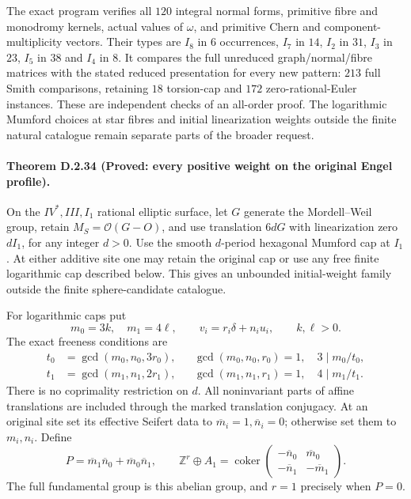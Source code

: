 The exact program 
verifies all $120$ integral normal forms, primitive fibre
and monodromy kernels, actual values of $\omega$, and
primitive Chern and component-multiplicity vectors.
Their types are $I_8$ in $6$ occurrences, $I_7$ in $14$,
$I_2$ in $31$, $I_3$ in $23$, $I_5$ in $38$ and $I_4$
in $8$. It compares the full unreduced graph/normal/fibre
matrices with the stated reduced presentation for every
new pattern: $213$ full Smith comparisons, retaining
$18$ torsion-cap and $172$ zero-rational-Euler instances.
These are independent checks of an all-order proof.
The logarithmic Mumford choices at star fibres and
initial linearization weights outside the finite natural
catalogue remain separate parts of the broader request.


\paragraph{Theorem D.2.34 (Proved: every positive weight on the original Engel profile).}
On the $IV^*,III,I_1$ rational elliptic surface, let $G$
generate the Mordell--Weil group, retain
$M_S=\mathcal O(G-O)$, and use translation $6dG$ with
linearization zero $dI_1$, for any integer $d>0$.
Use the smooth $d$-period hexagonal Mumford cap at $I_1$.
At either additive site one may retain the original cap
or use any free finite logarithmic cap described below.
This gives an unbounded initial-weight family outside
the finite sphere-candidate catalogue.

For logarithmic caps put
\[
 m_0=3k,\quad m_1=4\ell,\qquad
 v_i=r_i\delta+n_i u_i,\qquad k,\ell>0.
\]
The exact freeness conditions are
\[
\begin{aligned}
 t_0&=\gcd(m_0,n_0,3r_0),&
 &\gcd(m_0,n_0,r_0)=1,\quad 3\mid m_0/t_0,\\
 t_1&=\gcd(m_1,n_1,2r_1),&
 &\gcd(m_1,n_1,r_1)=1,\quad 4\mid m_1/t_1 .
\end{aligned}                                             \tag{D.WE1}
\]
There is no coprimality restriction on $d$.
All noninvariant parts of affine translations are
included through the marked translation conjugacy.
At an original site set its effective Seifert data to
$\overline m_i=1,\overline n_i=0$; otherwise set them
to $m_i,n_i$. Define
\[
 P=\overline m_1\overline n_0+
   \overline m_0\overline n_1,\qquad
 \mathbb Z^r\oplus A_1=
 \operatorname{coker}
 \begin{pmatrix}
  -\overline n_0&\overline m_0\\
  -\overline n_1&-\overline m_1
 \end{pmatrix}.                                           \tag{D.WE2}
\]
The full fundamental group is this abelian group, and
$r=1$ precisely when $P=0$.

